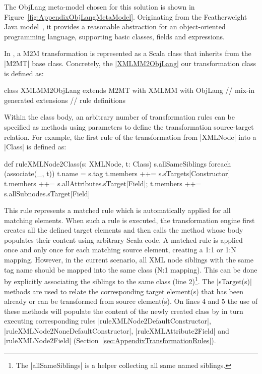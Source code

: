 The ObjLang meta-model chosen for this solution is shown in Figure~\ref{fig:AppendixObjLangMetaModel}.
Originating from the Featherweight Java model~\cite{Igarashi2001}, it provides a reasonable abstraction for an object-oriented programming language, supporting basic classes, fields and expressions.

In \SIGMA, a M2M transformation is represented as a Scala class that inherits from the \Scala|M2MT| base class.
Concretely, the \href{https://github.com/fikovnik/ttc14-fixml-sigma/blob/master/ttc14-fixml-base/src/fr/inria/spirals/sigma/ttc14/fixml/XMLMM2ObjLang.scala}{\Scala|XMLMM2ObjLang|} our transformation class is defined as:
%
\begin{scalacode}
class XMLMM2ObjLang extends M2MT with XMLMM with ObjLang { // mix-in generated extensions
  // rule definitions 
}  
\end{scalacode}
%
Within the class body, an arbitrary number of transformation rules can be specified as methods using parameters to define the transformation source-target relation.
For example, the first rule of the transformation from \Scala|XMLNode| into a \Scala|Class| is defined as:
%
\begin{scalacode}
def ruleXMLNode2Class(s: XMLNode, t: Class) {
  s.allSameSiblings foreach (associate(_, t))
  t.name = s.tag
  t.members ++= s.sTargets[Constructor]
  t.members ++= s.allAttributes.sTarget[Field]; t.members ++= s.allSubnodes.sTarget[Field]
}
\end{scalacode}
%
This rule represents a matched rule which is automatically applied for all matching elements.
When such a rule is executed, the transformation engine first creates all the defined target elements and then calls the method whose body populates their content using arbitrary Scala code.
A matched rule is applied once and only once for each matching source element, creating a 1:1 or 1:N mapping.
However, in the current scenario, all XML node siblings with the same tag name should be mapped into the same class (N:1 mapping).
This can be done by explicitly associating the siblings to the same class (line 2)\footnote{The \Scala|allSameSiblings| is a helper collecting all same named siblings.}.
%
The \Scala|sTarget(s)| methods are used to relate the corresponding target element(s) that has been already or can be transformed from source element(s).
On lines 4 and 5 the use of these methods will populate the content of the newly created class by in turn executing corresponding rules \Scala|ruleXMLNode2DefaultConstructor|, \Scala|ruleXMLNode2NoneDefaultConstructor|, \Scala|ruleXMLAttribute2Field| and \Scala|ruleXMLNode2Field| (\Cf Section~\ref{sec:AppendixTransformationRules}).

